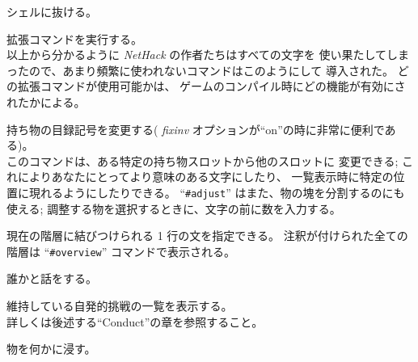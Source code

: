 シェルに抜ける。
\item[\tb{\#}]
拡張コマンドを実行する。\\
以上から分かるように {\it NetHack\/} の作者たちはすべての文字を
使い果たしてしまったので、あまり頻繁に使われないコマンドはこのようにして
導入された。
どの拡張コマンドが使用可能かは、
ゲームのコンパイル時にどの機能が有効にされたかによる。
\item[\tb{\#adjust}]
持ち物の目録記号を変更する(
{\it fixinv\/}
オプションが``on''の時に非常に便利である)。\\
このコマンドは、ある特定の持ち物スロットから他のスロットに
変更できる; これによりあなたにとってより意味のある文字にしたり、
一覧表示時に特定の位置に現れるようにしたりできる。
``{\tt \#adjust}'' はまた、物の塊を分割するのにも使える;
調整する物を選択するときに、文字の前に数を入力する。
\item[\tb{\#annotate}]
現在の階層に結びつけられる 1 行の文を指定できる。
注釈が付けられた全ての階層は
``{\tt \#overview}'' コマンドで表示される。
\item[\tb{\#chat}]
誰かと話をする。
\item[\tb{\#conduct}]
維持している自発的挑戦の一覧を表示する。\\
詳しくは後述する``Conduct''の章を参照すること。
\item[\tb{\#dip}]
物を何かに浸す。
